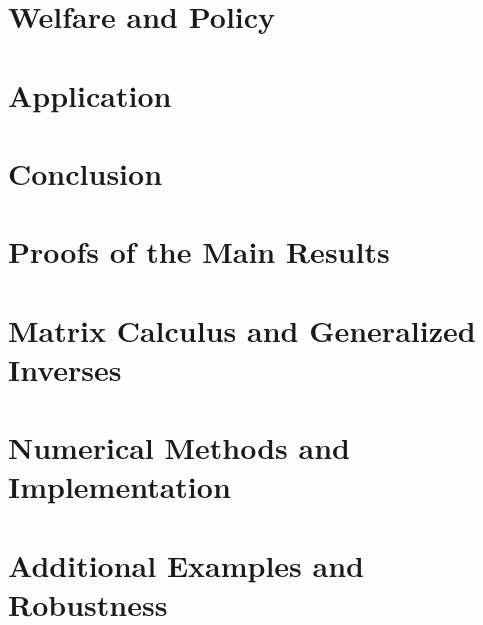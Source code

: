 \documentclass[11pt]{article}
\begin{document}


\section{Welfare and Policy}



\section{Application}



\section{Conclusion}






\appendix
\appendixpage

\section{Proofs of the Main Results}


\section{Matrix Calculus and Generalized Inverses}


\section{Numerical Methods and Implementation}


\section{Additional Examples and Robustness}

\end{document}
